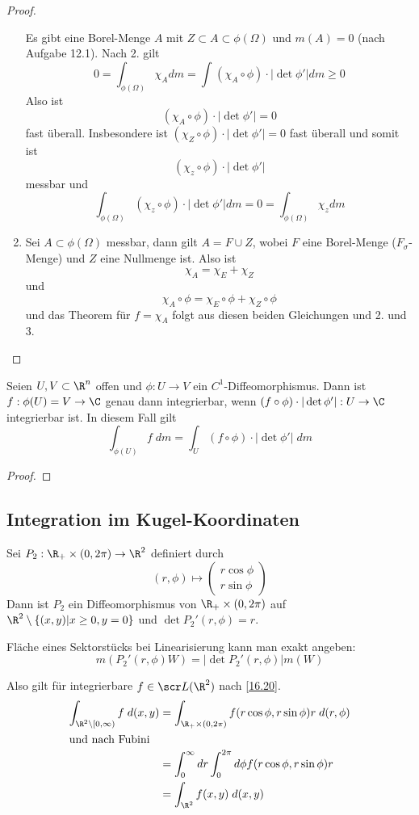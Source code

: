 \documentclass[a4paper,10pt]{scrbook}
\begin{document}
\begin{thm}
\begin{proof}
\begin{enumerate}
				Es gibt eine Borel-Menge $A$ mit $Z\subset A \subset \phi(\Omega)$ und $m(A)=0$ (nach Aufgabe 12.1).
				Nach 2. gilt
				\[
					0 = \int_{\phi(\Omega)} \chi_A dm = \int_{}(\chi_A \circ \phi) \cdot |\det \phi'| dm \ge 0
				\]
				Also ist
				\[
					(\chi_A \circ \phi)\cdot |\det \phi'| = 0
				\]
				fast überall.
				Insbesondere ist $(\chi_Z\circ \phi)\cdot |\det \phi'|=0$ fast überall und somit ist
				\[
					(\chi_z \circ \phi)\cdot |\det \phi'|
				\]
				messbar und
				\[
					\int_{\phi(\Omega)} (\chi_z \circ \phi)\cdot |\det \phi'| dm = 0 = \int_{\phi(\Omega)} \chi_z dm
				\]
			\item
				Sei $A\subset \phi(\Omega)$ messbar, dann gilt $A = F\cup Z$, wobei $F$ eine Borel-Menge ($F_\sigma$-Menge) und $Z$ eine Nullmenge ist.
				Also ist
				\[
					\chi_A = \chi_E + \chi_Z
				\]
				und
				\[
					\chi_A \circ \phi = \chi_E \circ \phi + \chi_Z \circ \phi
				\]
				und das Theorem für $f=\chi_A$ folgt aus diesen beiden Gleichungen und 2. und 3.
		\end{enumerate}
	\end{proof}
\end{thm}

\begin{kor}
	\label{16.20}
	Seien $U,V\subset \R^n$ offen und $\phi:U\to V$ ein $C^1$-Diffeomorphismus.
	Dann ist $f:\phi(U)=V \to \C$  genau dann integrierbar, wenn $(f\circ \phi)\cdot |\det \phi'| : U\to \C$ integrierbar ist.
	In diesem Fall gilt
	\[
		\int_{\phi(U)}f\;dm = \int_U (f\circ \phi)\cdot |\det \phi'| \; dm
	\]
	\begin{proof}
		\fixme[Übung]
	\end{proof}
\end{kor}


\subsection{Integration im Kugel-Koordinaten}

Sei $P_2 : \R_+ \times (0,2\pi)\to \R^2$ definiert durch
\[
	(r,\phi) \mapsto \begin{pmatrix}r\cos \phi\\ r\sin \phi\end{pmatrix}
\]
Dann ist $P_2$ ein Diffeomorphismus von $\R_+ \times (0,2\pi)$ auf $\R^2 \setminus \{(x,y) | x\ge 0, y= 0\}$ und
$\det P_2'(r,\phi) = r$.
\begin{note}
	Fläche eines Sektorstücks bei Linearisierung kann man exakt angeben:
	\[
		m(P_2'(r,\phi)W) = |\det P_2'(r,\phi)|m(W)
	\]
\end{note}
Also gilt für integrierbare $f\in \scr L(\R^2)$ nach \ref{16.20}.
\begin{align*}
	\int_{\R^2\setminus [0,\infty)}f\;d(x,y) &= \int_{\R_+\times (0,2\pi)}f(r\cos \phi, r\sin \phi) r \; d(r,\phi)\\
	\intertext{und nach Fubini}
	&= \int_0^\infty dr \int_0^{2\pi}d\phi f(r\cos \phi,r\sin \phi) r\\
	&= \int_{\R^2} f(x,y) \; d(x,y)
\end{align*}
\end{document}
